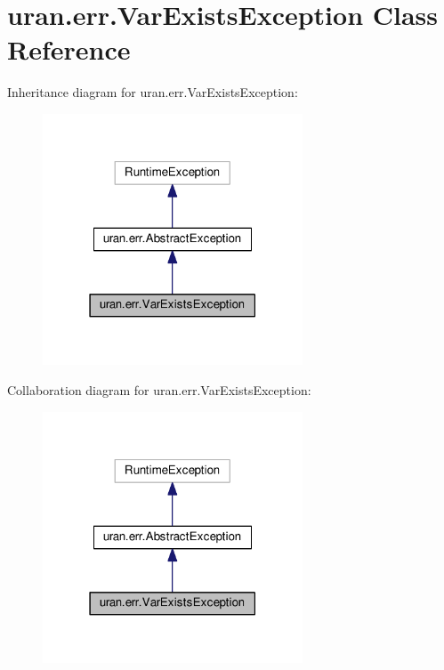 \hypertarget{classuran_1_1err_1_1_var_exists_exception}{}\section{uran.\+err.\+Var\+Exists\+Exception Class Reference}
\label{classuran_1_1err_1_1_var_exists_exception}


Inheritance diagram for uran.\+err.\+Var\+Exists\+Exception\+:
\nopagebreak
\begin{figure}[H]
\begin{center}
\leavevmode
\includegraphics[width=219pt]{classuran_1_1err_1_1_var_exists_exception__inherit__graph}
\end{center}
\end{figure}


Collaboration diagram for uran.\+err.\+Var\+Exists\+Exception\+:
\nopagebreak
\begin{figure}[H]
\begin{center}
\leavevmode
\includegraphics[width=219pt]{classuran_1_1err_1_1_var_exists_exception__coll__graph}
\end{center}
\end{figure}
